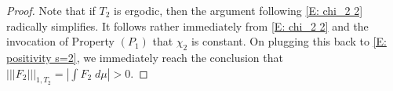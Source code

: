 \documentclass[11pt]{amsart}
\theoremstyle{definition}
\DeclareMathOperator*{\E}{\mathbb{E}}
\newcommand{\CI}{{\mathcal I}}
\newcommand{\norm}[1]{\left\Vert #1\right\Vert}
\newcommand{\nnorm}[1]{\lvert\!|\!| #1|\!|\!\rvert}
\newcommand{\1}{{\mathbf{1}}}
\newcommand{\abs}[1]{\mathopen{}\left| #1\mathclose{}\right|}
\begin{document}
\begin{proof}
     Note that if $T_2$ is ergodic, then the argument following \eqref{E: chi_2 2} radically simplifies. It follows rather immediately from \eqref{E: chi_2 2} and the invocation of Property $(P_1)$ that $\chi_2$ is constant. On plugging this back to \eqref{E: positivity s=2}, we immediately reach the conclusion that $\nnorm{F_2}_{1,T_2} = \abs{\int F_2\; d\mu} >0$.
\end{proof}
\end{document}
